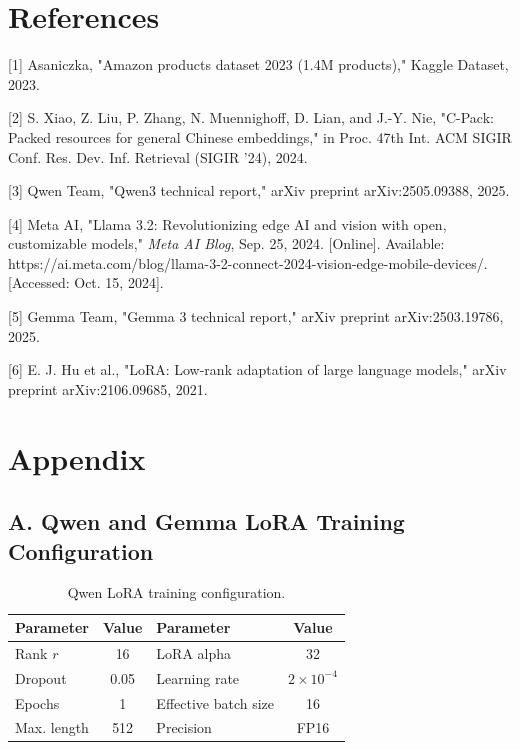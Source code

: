 \documentclass{article}
\begin{document}
\section*{References}

\small

[1] Asaniczka, "Amazon products dataset 2023 (1.4M products)," Kaggle Dataset, 2023.
\medskip

[2] S. Xiao, Z. Liu, P. Zhang, N. Muennighoff, D. Lian, and J.-Y. Nie, "C-Pack: Packed resources for general Chinese embeddings," in Proc. 47th Int. ACM SIGIR Conf. Res. Dev. Inf. Retrieval (SIGIR '24), 2024.
\medskip

[3] Qwen Team, "Qwen3 technical report," arXiv preprint arXiv:2505.09388, 2025.
\medskip

[4] Meta AI, "Llama 3.2: Revolutionizing edge AI and vision with open, customizable models," \textit{Meta AI Blog}, Sep. 25, 2024. [Online]. Available: https://ai.meta.com/blog/llama-3-2-connect-2024-vision-edge-mobile-devices/. [Accessed: Oct. 15, 2024].
\medskip

[5] Gemma Team, "Gemma 3 technical report," arXiv preprint arXiv:2503.19786, 2025.
\medskip

[6] E. J. Hu et al., "LoRA: Low-rank adaptation of large language models," arXiv preprint arXiv:2106.09685, 2021.
\medskip

\section*{Appendix}

\subsection*{A. Qwen and Gemma LoRA Training Configuration}

\begin{table}[h]
\centering
\caption{Qwen LoRA training configuration.}
\label{tab:lora}
\small
\begin{tabular}{lc@{\qquad}lc}
\toprule
Parameter & Value & Parameter & Value \\
\midrule
Rank $r$ & 16 & LoRA alpha & 32 \\
Dropout & 0.05 & Learning rate & $2\times10^{-4}$ \\
Epochs & 1 & Effective batch size & 16 \\
Max. length & 512 & Precision & FP16 \\
\bottomrule
\end{tabular}
\end{table}
\end{document}
